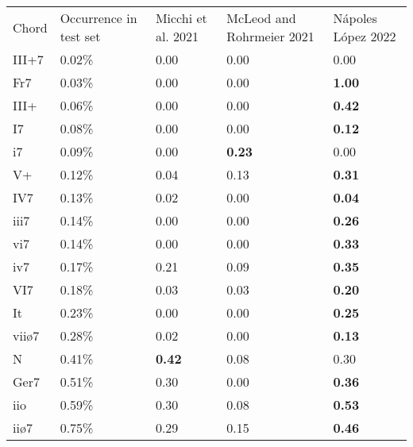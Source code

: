 \begin{tabular}{lllll}
Chord & Occurrence in test set & Micchi et al. 2021 & McLeod and Rohrmeier 2021 & Nápoles López 2022 \\
III+7 & 0.02\%                 & 0.00                 & 0.00                        & 0.00           \\
Fr7   & 0.03\%                 & 0.00                 & 0.00                        & \textbf{1.00}  \\
III+  & 0.06\%                 & 0.00                 & 0.00                        & \textbf{0.42}  \\
I7    & 0.08\%                 & 0.00                 & 0.00                        & \textbf{0.12}  \\
i7    & 0.09\%                 & 0.00                 & \textbf{0.23}               & 0.00           \\
V+    & 0.12\%                 & 0.04                 & 0.13                        & \textbf{0.31}  \\
IV7   & 0.13\%                 & 0.02                 & 0.00                        & \textbf{0.04}  \\
iii7  & 0.14\%                 & 0.00                 & 0.00                        & \textbf{0.26}  \\
vi7   & 0.14\%                 & 0.00                 & 0.00                        & \textbf{0.33}  \\
iv7   & 0.17\%                 & 0.21                 & 0.09                        & \textbf{0.35}  \\
VI7   & 0.18\%                 & 0.03                 & 0.03                        & \textbf{0.20}  \\
It    & 0.23\%                 & 0.00                 & 0.00                        & \textbf{0.25}  \\
viiø7 & 0.28\%                 & 0.02                 & 0.00                        & \textbf{0.13}  \\
N     & 0.41\%                 & \textbf{0.42}        & 0.08                        & 0.30           \\
Ger7  & 0.51\%                 & 0.30                 & 0.00                        & \textbf{0.36}  \\
iio   & 0.59\%                 & 0.30                 & 0.08                        & \textbf{0.53}  \\
iiø7  & 0.75\%                 & 0.29                 & 0.15                        & \textbf{0.46}  \\

\end{tabular}
